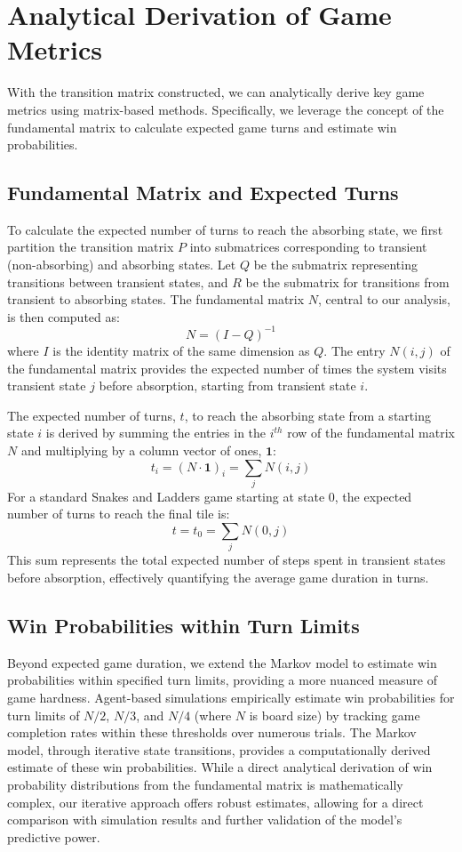 \section{Analytical Derivation of Game Metrics}

With the transition matrix constructed, we can analytically derive key game metrics using matrix-based methods. Specifically, we leverage the concept of the fundamental matrix to calculate expected game turns and estimate win probabilities.

\subsection{Fundamental Matrix and Expected Turns}

To calculate the expected number of turns to reach the absorbing state, we first partition the transition matrix $P$ into submatrices corresponding to transient (non-absorbing) and absorbing states. Let $Q$ be the submatrix representing transitions between transient states, and $R$ be the submatrix for transitions from transient to absorbing states. The fundamental matrix $N$, central to our analysis, is then computed as:
\[
N = (I - Q)^{-1}
\]
where $I$ is the identity matrix of the same dimension as $Q$. The entry $N(i, j)$ of the fundamental matrix provides the expected number of times the system visits transient state $j$ before absorption, starting from transient state $i$.

The expected number of turns, $t$, to reach the absorbing state from a starting state $i$ is derived by summing the entries in the $i^{th}$ row of the fundamental matrix $N$ and multiplying by a column vector of ones, $\mathbf{1}$:
\[
t_i = (N \cdot \mathbf{1})_i = \sum_{j} N(i, j)
\]
For a standard Snakes and Ladders game starting at state 0, the expected number of turns to reach the final tile is:
\[
t = t_0 = \sum_{j} N(0, j)
\]
This sum represents the total expected number of steps spent in transient states before absorption, effectively quantifying the average game duration in turns.

\subsection{Win Probabilities within Turn Limits}

Beyond expected game duration, we extend the Markov model to estimate win probabilities within specified turn limits, providing a more nuanced measure of game hardness. Agent-based simulations empirically estimate win probabilities for turn limits of $N/2$, $N/3$, and $N/4$ (where $N$ is board size) by tracking game completion rates within these thresholds over numerous trials. The Markov model, through iterative state transitions, provides a computationally derived estimate of these win probabilities. While a direct analytical derivation of win probability distributions from the fundamental matrix is mathematically complex, our iterative approach offers robust estimates, allowing for a direct comparison with simulation results and further validation of the model's predictive power.

